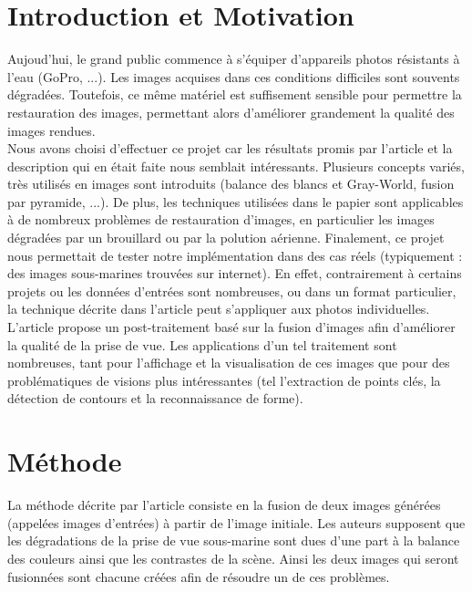 \documentclass[twoside]{article}
\begin{document}
\section{Introduction et Motivation}
Aujoud'hui, le grand public commence à s'équiper d'appareils photos résistants à l'eau (GoPro, ...). Les images acquises dans ces conditions difficiles sont souvents dégradées. Toutefois, ce même matériel est suffisement sensible pour permettre la restauration des images, permettant alors d'améliorer grandement la qualité des images rendues.\\
Nous avons choisi d'effectuer ce projet car les résultats promis par l'article et la description qui en était faite nous semblait intéressants. Plusieurs concepts variés, très utilisés en images sont introduits (balance des blancs et Gray-World, fusion par pyramide, ...). De plus, les techniques utilisées dans le papier sont applicables à de nombreux problèmes de restauration d'images, en particulier les images dégradées par un brouillard ou par la polution aérienne. Finalement, ce projet nous permettait de tester notre implémentation dans des cas réels (typiquement : des images sous-marines trouvées sur internet). En effet, contrairement à certains projets ou les données d'entrées sont nombreuses, ou dans un format particulier, la technique décrite dans l'article peut s'appliquer aux photos individuelles.\\
L’article propose un post-traitement basé sur la fusion d’images afin d’améliorer la qualité de la prise de vue. Les applications d’un tel traitement sont nombreuses, tant pour l’affichage et la visualisation de ces images que pour des problématiques de visions plus intéressantes (tel l’extraction de points clés, la détection de contours et la reconnaissance de forme).\\


\section{Méthode}

La méthode décrite par l’article consiste en la fusion de deux images générées (appelées images d'entrées) à partir de l’image initiale. Les auteurs supposent que les dégradations de la prise de vue sous-marine sont dues d’une part à la balance des couleurs ainsi que les contrastes de la scène. Ainsi les deux images qui seront fusionnées sont chacune créées afin de résoudre un de ces problèmes.\\
\end{document}
